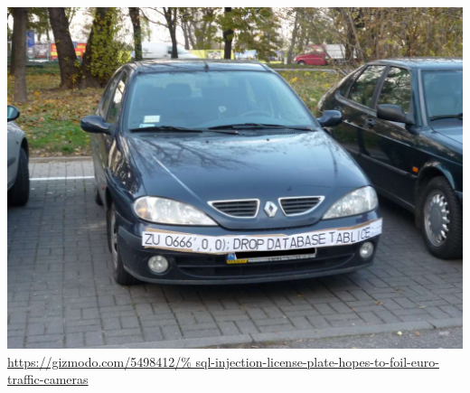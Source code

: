 \documentclass[utf8]{beamer}
\begin{document}
\begin{frame}
  \centering
  \includegraphics[width=\textwidth]{18mpenleoksq8jpg.jpg}
  \fontsize{10pt}{10pt}\selectfont
  \url{https://gizmodo.com/5498412/%
       sql-injection-license-plate-hopes-to-foil-euro-traffic-cameras}
\end{frame}
\end{document}
